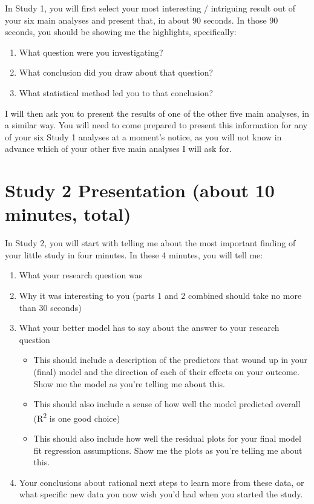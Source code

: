 \documentclass[]{book}
\providecommand{\tightlist}{%
  \setlength{\itemsep}{0pt}\setlength{\parskip}{0pt}}
\theoremstyle{definition}
\theoremstyle{definition}
\theoremstyle{definition}
\theoremstyle{remark}
\begin{document}
In Study 1, you will first select your most interesting / intriguing
result out of your six main analyses and present that, in about 90
seconds. In those 90 seconds, you should be showing me the highlights,
specifically:

\begin{enumerate}
\def\labelenumi{\alph{enumi}.}
\tightlist
\item
  What question were you investigating?
\item
  What conclusion did you draw about that question?
\item
  What statistical method led you to that conclusion?
\end{enumerate}

I will then ask you to present the results of one of the other five main
analyses, in a similar way. You will need to come prepared to present
this information for any of your six Study 1 analyses at a moment's
notice, as you will not know in advance which of your other five main
analyses I will ask for.

\hypertarget{study-2-presentation-about-10-minutes-total}{%
\section{Study 2 Presentation (about 10 minutes,
total)}\label{study-2-presentation-about-10-minutes-total}}

In Study 2, you will start with telling me about the most important
finding of your little study in four minutes. In these 4 minutes, you
will tell me:

\begin{enumerate}
\def\labelenumi{\alph{enumi}.}
\tightlist
\item
  What your research question was
\item
  Why it was interesting to you (parts 1 and 2 combined should take no
  more than 30 seconds)
\item
  What your better model has to say about the answer to your research
  question

  \begin{itemize}
  \tightlist
  \item
    This should include a description of the predictors that wound up in
    your (final) model and the direction of each of their effects on
    your outcome. Show me the model as you're telling me about this.
  \item
    This should also include a sense of how well the model predicted
    overall (R\textsuperscript{2} is one good choice)
  \item
    This should also include how well the residual plots for your final
    model fit regression assumptions. Show me the plots as you're
    telling me about this.
  \end{itemize}
\item
  Your conclusions about rational next steps to learn more from these
  data, or what specific new data you now wish you'd had when you
  started the study.
\end{enumerate}
\end{document}
